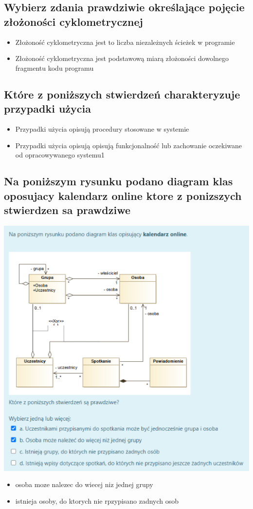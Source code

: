 \documentclass[11pt]{article}
\begin{document}
\subsection{Wybierz zdania prawdziwie określające pojęcie złożoności cyklometrycznej}
\label{sec:orgc4a8078}
\begin{itemize}
\item Złożoność cyklometryczna jest to liczba niezależnych ścieżek w programie
\item Złożoność cyklometryczna jest podstawową miarą złożoności dowolnego fragmentu kodu programu
\end{itemize}
\subsection{Które z poniższych stwierdzeń charakteryzuje przypadki użycia}
\label{sec:org773dd6e}
\begin{itemize}
\item Przypadki użycia opisują procedury stosowane w systemie
\item Przypadki użycia opisują opisują funkcjonalność lub zachowanie oczekiwane od opracowywanego systemu1
\end{itemize}
\subsection{Na poniższym rysunku podano diagram klas oposujacy kalendarz online ktore z ponizszych stwierdzen sa prawdziwe}
\label{sec:orgc837105}
\begin{center}
\includegraphics[width=.9\linewidth]{./zadanie1.png}
\end{center}
\begin{itemize}
\item osoba moze nalezec do wiecej niz jednej grupy
\item istnieja osoby, do ktorych nie rpzypisano zadnych osob
\end{itemize}
\end{document}
